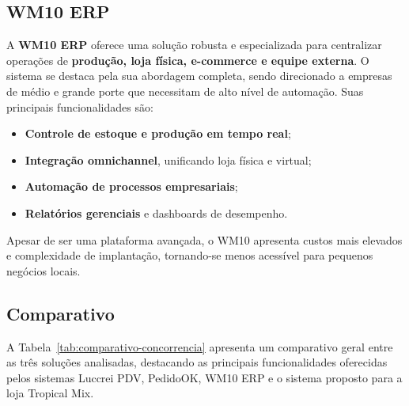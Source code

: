\subsection{WM10 ERP}

A \textbf{WM10 ERP} oferece uma solução robusta e especializada para centralizar operações de \textbf{produção, loja física, e-commerce e equipe externa}. O sistema se destaca pela sua abordagem completa, sendo direcionado a empresas de médio e grande porte que necessitam de alto nível de automação. Suas principais funcionalidades são:

\begin{itemize}
    \item \textbf{Controle de estoque e produção em tempo real};
    \item \textbf{Integração omnichannel}, unificando loja física e virtual;
    \item \textbf{Automação de processos empresariais};
    \item \textbf{Relatórios gerenciais} e dashboards de desempenho.
\end{itemize}

Apesar de ser uma plataforma avançada, o WM10 apresenta custos mais elevados e complexidade de implantação, tornando-se menos acessível para pequenos negócios locais.

\subsection{Comparativo}

A Tabela~\ref{tab:comparativo-concorrencia} apresenta um comparativo geral entre as três soluções analisadas, destacando as principais funcionalidades oferecidas pelos sistemas Luccrei PDV, PedidoOK, WM10 ERP e o sistema proposto para a loja Tropical Mix.

